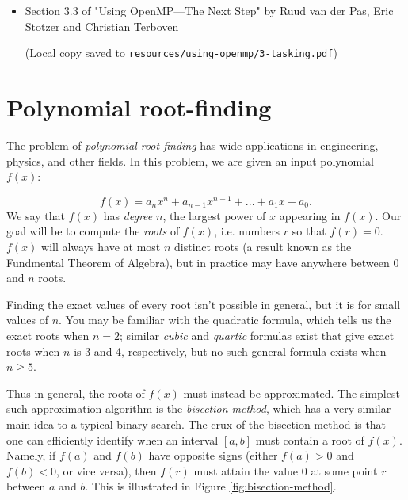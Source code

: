 \documentclass{article}
\newcommand{\resource}[1]{(Local copy saved to \texttt{#1})}
\theoremstyle{definition}
\begin{document}
\begin{itemize}
    \item Section 3.3 of "Using OpenMP—The Next Step" by Ruud van der Pas, Eric Stotzer and Christian Terboven
    
    \resource{resources/using-openmp/3-tasking.pdf}
\end{itemize}

\section{Polynomial root-finding}

The problem of \emph{polynomial root-finding} has wide applications in engineering, physics, and other fields. In this problem, we are given an input polynomial $f(x)$:

\begin{equation*}
    f(x) = a_nx^n + a_{n-1}x^{n-1} + ... + a_1x + a_0.
\end{equation*}
We say that $f(x)$ has \emph{degree} $n$, the largest power of $x$ appearing in $f(x)$. Our goal will be to compute the \emph{roots} of $f(x)$, i.e. numbers $r$ so that $f(r) = 0$. $f(x)$ will always have at most $n$ distinct roots (a result known as the Fundmental Theorem of Algebra), but in practice may have anywhere between $0$ and $n$ roots.

Finding the exact values of every root isn't possible in general, but it is for small values of $n$. You may be familiar with the quadratic formula, which tells us the exact roots when $n = 2$; similar \emph{cubic} and \emph{quartic} formulas exist that give exact roots when $n$ is 3 and 4, respectively, but no such general formula exists when $n \geq 5$.

Thus in general, the roots of $f(x)$ must instead be approximated. The simplest such approximation algorithm is the \emph{bisection method}, which has a very similar main idea to a typical binary search. The crux of the bisection method is that one can efficiently identify when an interval $[a, b]$ must contain a root of $f(x)$. Namely, if $f(a)$ and $f(b)$ have opposite signs (either $f(a) > 0$ and $f(b) < 0$, or vice versa), then $f(r)$ must attain the value 0 at some point $r$ between $a$ and $b$. This is illustrated in Figure \ref{fig:bisection-method}.
\end{document}
